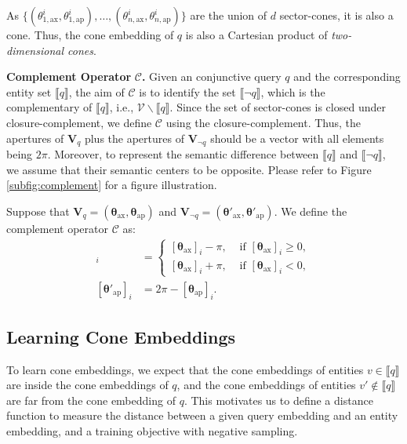 \documentclass{article}
\newcommand{\gb}[1]{\boldsymbol{#1}}
\newcommand{\taxis}{\text{ax}}
\newcommand{\targ}{\text{ap}}
\begin{document}
As $\{({\theta}_{1,\taxis}^i, {\theta}_{1,\targ}^i), \dots, ({\theta}_{n,\taxis}^i, {\theta}_{n,\targ}^i)\}$ are the union of $d$ sector-cones, it is also a cone. Thus, the cone embedding of $q$ is also a Cartesian product of \textit{two-dimensional cones}.



\textbf{Complement Operator} $\mathcal{C}$\textbf{.} Given an conjunctive query $q$ and the corresponding entity set $\llbracket q\rrbracket$, the aim of $\mathcal{C}$ is to identify the set $\llbracket \neg q\rrbracket$, which is the complementary of $\llbracket q\rrbracket$, i.e., $\mathcal{V}\backslash \llbracket q\rrbracket$. Since the set of sector-cones is closed under closure-complement, we define $\mathcal{C}$ using the closure-complement. Thus, the apertures of $\textbf{V}_{q}$ plus the apertures of $\textbf{V}_{\neg q}$ should be a vector with all elements being $2\pi$. 
Moreover, to represent the semantic difference between $\llbracket q\rrbracket$ and $\llbracket \neg q\rrbracket$, we assume that their semantic centers to be opposite. Please refer to Figure \ref{subfig:complement} for a figure illustration.

Suppose that $\textbf{V}_q=(\gb{\theta}_{\taxis},\gb{\theta}_{\targ})$ and $\textbf{V}_{\neg q}=(\gb{\theta}'_{\taxis},\gb{\theta}'_{\targ})$. We define the complement operator $\mathcal{C}$ as:
\begin{align*}
   [\gb{\theta}'_{\taxis}]_i&=
    \begin{cases}
        [\gb{\theta}_{\taxis}]_i-\pi,&\text{ if }[\gb{\theta}_{\taxis}]_i\ge 0,\\
        [\gb{\theta}_{\taxis}]_i+\pi,&\text{ if }[\gb{\theta}_{\taxis}]_i< 0,
    \end{cases}\\
    [\gb{\theta}'_{\targ}]_i&=2\pi-[\gb{\theta}_{\targ}]_i.
\end{align*}
\subsection{Learning Cone Embeddings}\label{sec:train_obj}
\vspace{-1mm}
To learn cone embeddings, we expect that the cone embeddings of entities $v\in \llbracket q\rrbracket$ are inside the cone embeddings of $q$, and the cone embeddings of entities $v'\notin \llbracket q\rrbracket$ are far from the cone embedding of $q$. This motivates us to define a distance function to measure the distance between a given query embedding and an entity embedding, and a training objective with negative sampling.
\end{document}
